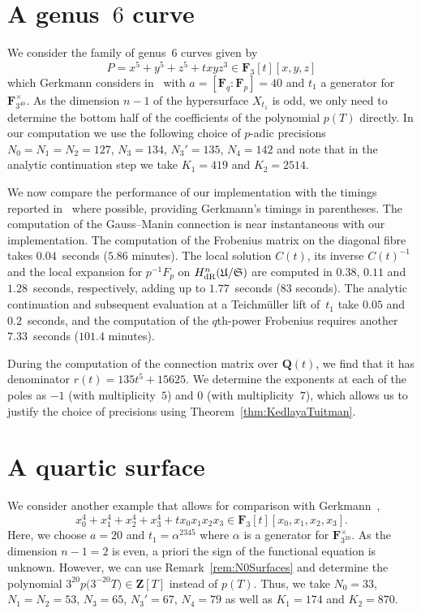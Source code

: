 \section{A genus~$6$ curve}

We consider the family of genus~$6$ curves given by 
\begin{equation}
P = x^5 + y^5 + z^5 + t x y z^3 \in \mathbf{F}_3[t][x,y,z]
\end{equation}
which Gerkmann considers in~\citep[\S 7.4]{Gerkmann2007} with 
$a = [\mathbf{F}_q : \mathbf{F}_p] = 40$ and $t_1$ a 
generator for $\mathbf{F}_{3^{40}}^{\times}$.  As the dimension 
$n - 1$ of the hypersurface $X_{t_1}$ is odd, we only need to 
determine the bottom half of the coefficients of the polynomial 
$p(T)$ directly.  In our computation we use the following choice of 
$p$-adic precisions $N_0 = N_1 = N_2 = 127$, $N_3 = 134$, $N_3' = 135$, 
$N_4 = 142$ and note that in the analytic continuation step we 
take $K_1 = 419$ and $K_2 = 2514$.

We now compare the performance of our implementation with the 
timings reported in~\citep[\S 7.4]{Gerkmann2007} where possible, 
providing Gerkmann's timings in parentheses.  The computation of the 
Gauss--Manin connection is near instantaneous with our implementation.  
The computation of the Frobenius matrix on the diagonal fibre takes 
$0.04$~seconds ($5.86$ minutes).  The local solution $C(t)$, its 
inverse $C(t)^{-1}$ and the local expansion for $p^{-1}F_p$ on 
$H_{\text{dR}}^n(\mathfrak{U}/\mathfrak{S})$ are computed in $0.38$, $0.11$ 
and $1.28$~seconds, respectively, adding up to $1.77$~seconds ($83$ seconds). 
The analytic continuation and subsequent evaluation at a Teichm\"uller lift 
of~$t_1$ take $0.05$ and $0.2$~seconds, and the computation of the $q$th-power 
Frobenius requires another $7.33$~seconds ($101.4$ minutes).

During the computation of the connection matrix over $\mathbf{Q}(t)$, 
we find that it has denominator $r(t) = 135 t^5 + 15625$.  We 
determine the exponents at each of the poles as $-1$ (with multiplicity~$5$) 
and $0$ (with multiplicity~$7$), which allows us to justify the choice 
of precisions using Theorem~\ref{thm:KedlayaTuitman}.

\section{A quartic surface}

We consider another example that allows for comparison with 
Gerkmann~\citep[\S 7.5]{Gerkmann2007},
\begin{equation}
x_0^4 + x_1^4 + x_2^4 + x_3^4 + t x_0 x_1 x_2 x_3 \in \mathbf{F}_3[t][x_0,x_1,x_2,x_3].
\end{equation}
Here, we choose $a = 20$ and $t_1 = \alpha^{2345}$ where 
$\alpha$ is a generator for $\mathbf{F}_{3^{20}}^{\times}$. 
As the dimension $n - 1 = 2$ is even, a priori the sign of the 
functional equation is unknown.  However, we can use 
Remark~\ref{rem:N0Surfaces} and determine the polynomial 
$3^{20} p\bigl(3^{-20} T\bigr) \in \mathbf{Z}[T]$ instead of $p(T)$. 
Thus, we take $N_0 = 33$, $N_1 = N_2 = 53$, $N_3 = 65$, 
$N_3' = 67$, $N_4 = 79$ as well as $K_1 = 174$ and $K_2 = 870$.

